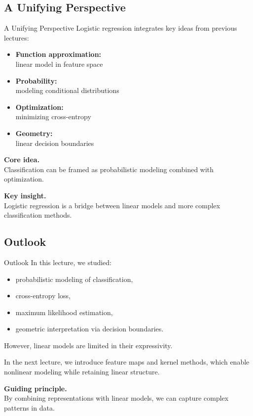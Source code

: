 \documentclass[aspectratio=169,11pt]{beamer}
\begin{document}
\subsection{A Unifying Perspective}
\begin{frame}[t,allowframebreaks]{A Unifying Perspective}
\small
Logistic regression integrates key ideas from previous lectures:

\begin{itemize}
    \item \textbf{Function approximation:}\\ linear model in feature space
    \item \textbf{Probability:}\\ modeling conditional distributions
    \item \textbf{Optimization:}\\ minimizing cross-entropy
    \item \textbf{Geometry:}\\ linear decision boundaries
\end{itemize}

\textbf{Core idea.}\\ Classification can be framed as probabilistic modeling combined with optimization.

\textbf{Key insight.}\\ Logistic regression is a bridge between linear models and more complex classification methods.
\end{frame}

\subsection{Outlook}
\begin{frame}[t,allowframebreaks]{Outlook}
\small
In this lecture, we studied:

\begin{itemize}
    \item probabilistic modeling of classification,
    \item cross-entropy loss,
    \item maximum likelihood estimation,
    \item geometric interpretation via decision boundaries.
\end{itemize}

However, linear models are limited in their expressivity.

In the next lecture, we introduce feature maps and kernel methods, which enable nonlinear modeling while retaining linear structure.

\textbf{Guiding principle.}\\ By combining representations with linear models, we can capture complex patterns in data.
\end{frame}
\end{document}
